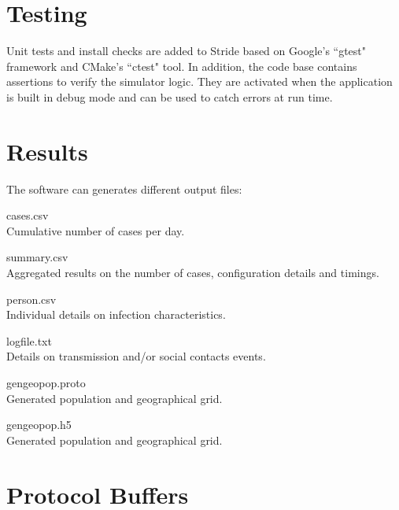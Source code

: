 %
\section{Testing}
Unit tests and install checks are added to Stride based on Google's ``gtest" framework and CMake's ``ctest" tool.
In addition, the code base contains assertions to verify the simulator logic.
They are activated when the application is built in debug mode and can be used to catch errors at run time.


\section{Results}
\label{section:Results}

The software can generates different output files:
\begin{compactdesc}
	\item [cases.csv] \ \\
	Cumulative number of cases per day.
	\item [summary.csv] \ \\
	Aggregated results on the number of cases, configuration details and timings.
	\item [person.csv] \ \\
	Individual details on infection characteristics.
	\item [logfile.txt] \ \\
	Details on transmission and/or social contacts events.
    \item [gengeopop.proto] \ \\
    Generated population and geographical grid.
    \item [gengeopop.h5] \ \\
    Generated population and geographical grid.
\end{compactdesc}


\section{Protocol Buffers}
\label{section:protobuf}

